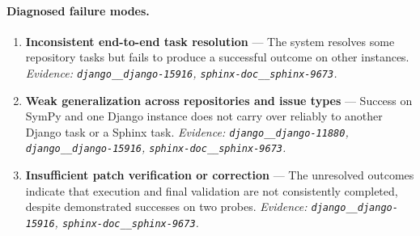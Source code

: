 \paragraph{Diagnosed failure modes.}\begin{enumerate}\itemsep1pt
\item \textbf{Inconsistent end-to-end task resolution} --- The system resolves some repository tasks but fails to produce a successful outcome on other instances. \emph{Evidence: \texttt{django\_\_django-15916}, \texttt{sphinx-doc\_\_sphinx-9673}.}
\item \textbf{Weak generalization across repositories and issue types} --- Success on SymPy and one Django instance does not carry over reliably to another Django task or a Sphinx task. \emph{Evidence: \texttt{django\_\_django-11880}, \texttt{django\_\_django-15916}, \texttt{sphinx-doc\_\_sphinx-9673}.}
\item \textbf{Insufficient patch verification or correction} --- The unresolved outcomes indicate that execution and final validation are not consistently completed, despite demonstrated successes on two probes. \emph{Evidence: \texttt{django\_\_django-15916}, \texttt{sphinx-doc\_\_sphinx-9673}.}
\end{enumerate}
